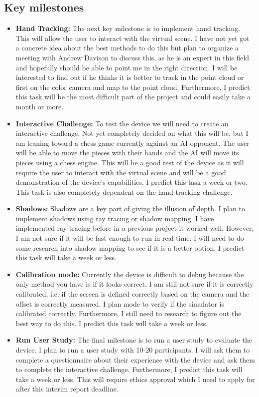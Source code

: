 \subsection{Key milestones}
\begin{itemize}
    \item \textbf{Hand Tracking:} The next key milestone is to implement hand tracking. This will allow the user to interact with the virtual scene. I have not yet got a concrete idea about the best methods to do this but plan to organize a meeting with Andrew Davison to discuss this, as he is an expert in this field and hopefully should be able to point me in the right direction. I will be interested to find out if he thinks it is better to track in the point cloud or first on the color camera and map to the point cloud. Furthermore, I predict this task will be the most difficult part of the project and could easily take a month or more.

    \item \textbf{Interactive Challenge:} To test the device we will need to create an interactive challenge. Not yet completely decided on what this will be, but I am leaning toward a chess game currently against an AI opponent. The user will be able to move the pieces with their hands and the AI will move its pieces using a chess engine. This will be a good test of the device as it will require the user to interact with the virtual scene and will be a good demonstration of the device's capabilities. I predict this task a week or two. This task is also completely dependent on the hand-tracking challenge.

    \item \textbf{Shadows:} Shadows are a key part of giving the illusion of depth. I plan to implement shadows using ray tracing or shadow mapping. I have implemented ray tracing before in a previous project it worked well. However, I am not sure if it will be fast enough to run in real time. I will need to do some research into shadow mapping to see if it is a better option. I predict this task will take a week or less.

    \item \textbf{Calibration mode:} Currently the device is difficult to debug because the only method you have is if it looks correct. I am still not sure if it is correctly calibrated, i.e. if the screen is defined correctly based on the camera and the offset is correctly measured. I plan mode to verify if the simulator is calibrated correctly. Furthermore, I still need to research to figure out the best way to do this. I predict this task will take a week or less.

    \item \textbf{Run User Study:} The final milestone is to run a user study to evaluate the device. I plan to run a user study with 10-20 participants. I will ask them to complete a questionnaire about their experience with the device and ask them to complete the interactive challenge. Furthermore, I predict this task will take a week or less. This will require ethics approval which I need to apply for after this interim report deadline.
\end{itemize}

